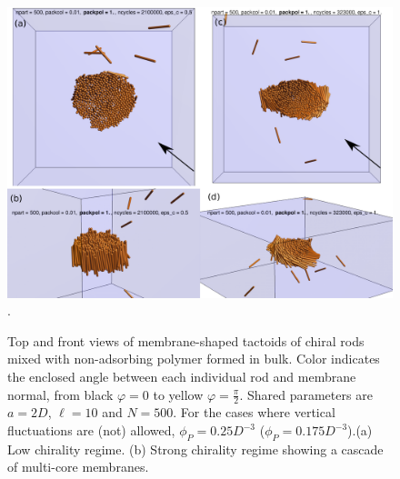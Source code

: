 \begin{figure}
\begin{center}
\includegraphics[width= .8\columnwidth]{figures/chapter-5/samples}.
	\caption{Top and front views of membrane-shaped tactoids of chiral rods mixed with non-adsorbing polymer formed in bulk. Color indicates the enclosed angle between each individual rod and membrane normal, from black $\varphi = 0$ to yellow $\varphi = \frac{\pi}{2}$. Shared parameters are $a = 2D$, $\ell = 10$ and $N = 500$. For the cases where vertical fluctuations are (not) allowed, $\phi_P=0.25D^{-3}$ ($\phi_P=0.175D^{-3}$).(a) Low chirality regime. (b) Strong chirality regime showing a cascade of multi-core membranes.}
 \label{multidomain}
\end{center}
\end{figure}


